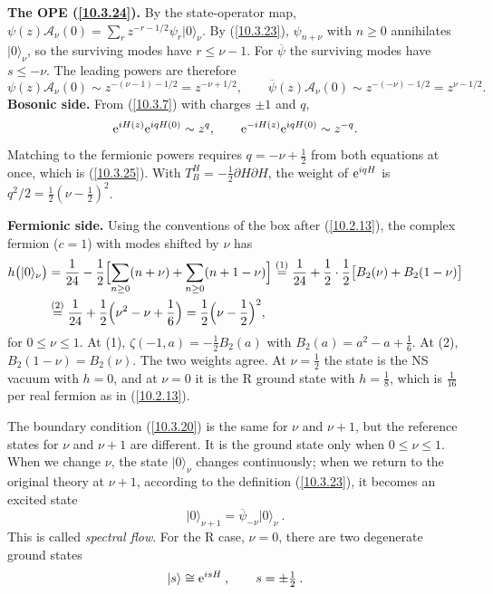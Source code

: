 	\begin{tcolorbox}[breakable]
		\begin{remark}
			\textbf{The OPE (\ref{10.3.24}).} By the state-operator map, $\psi(z)\mathscr A_\nu(0)=\sum_r z^{-r-1/2}\psi_r\lvert0\rangle_\nu$. By (\ref{10.3.23}), $\psi_{n+\nu}$ with $n\ge0$ annihilates $\lvert0\rangle_\nu$, so the surviving modes have $r\le\nu-1$. For $\overline\psi$ the surviving modes have $s\le-\nu$. The leading powers are therefore
			\begin{equation*}
				\psi(z)\mathscr A_\nu(0)\sim z^{-(\nu-1)-1/2}=z^{-\nu+1/2},\qquad \overline\psi(z)\mathscr A_\nu(0)\sim z^{-(-\nu)-1/2}=z^{\nu-1/2}.
			\end{equation*}
			\textbf{Bosonic side.} From (\ref{10.3.7}) with charges $\pm1$ and $q$,
			\begin{equation*}
				\mathrm{e}^{i H(z)}\mathrm{e}^{i qH(0)}\sim z^{q},\qquad \mathrm{e}^{-i H(z)}\mathrm{e}^{i qH(0)}\sim z^{-q} .
			\end{equation*}
			Matching to the fermionic powers requires $q=-\nu+\tfrac12$ from both equations at once, which is (\ref{10.3.25}). With $T^H_B=-\tfrac12\partial H\partial H$, the weight of $\mathrm{e}^{i qH}$ is $q^{2}/2=\tfrac12(\nu-\tfrac12)^{2}$.

			\textbf{Fermionic side.} Using the conventions of the box after (\ref{10.2.13}), the complex fermion ($c=1$) with modes shifted by $\nu$ has
			\begin{align*}
				h\bigl(\lvert0\rangle_\nu\bigr)&=\frac{1}{24}-\frac12\Bigl[\sum_{n\ge0}(n+\nu)+\sum_{n\ge0}(n+1-\nu)\Bigr]
				\overset{(1)}{=}\frac1{24}+\frac12\cdot\frac12\bigl[B_2(\nu)+B_2(1-\nu)\bigr]\\
				&\overset{(2)}{=}\frac1{24}+\frac12\Bigl(\nu^{2}-\nu+\frac16\Bigr)=\frac12\Bigl(\nu-\frac12\Bigr)^{2} ,
			\end{align*}
			for $0\le\nu\le1$. At (1), $\zeta(-1,a)=-\tfrac12B_2(a)$ with $B_2(a)=a^{2}-a+\tfrac16$. At (2), $B_2(1-\nu)=B_2(\nu)$. The two weights agree. At $\nu=\tfrac12$ the state is the NS vacuum with $h=0$, and at $\nu=0$ it is the R ground state with $h=\tfrac18$, which is $\tfrac1{16}$ per real fermion as in (\ref{10.2.13}).
		\end{remark}
	\end{tcolorbox}
	
	The boundary condition (\ref{10.3.20}) is the same for $\nu$ and $\nu+1$, but the reference states for $\nu$ and $\nu+1$ are different. It is the ground state only when $0\leq\nu\leq 1$. When we change $\nu$, the state $\lvert 0\rangle_{\nu}$ changes continuously; when we return to the original theory at $\nu+1$, according to the definition (\ref{10.3.23}), it becomes an excited state
	\begin{equation}
		\lvert 0\rangle_{\nu+1} =\overline{\psi}_{-\nu}\lvert 0\rangle_{\nu} \:. \label{10.3.26}
	\end{equation}
	This is called \emph{spectral flow}. For the R case, $\nu=0$, there are two degenerate ground states
	\begin{equation}
		\lvert s\rangle \cong \mathrm{e}^{i s H} \:, \qquad s=\pm\tfrac{1}{2} \:. \label{10.3.27}
	\end{equation}
	
